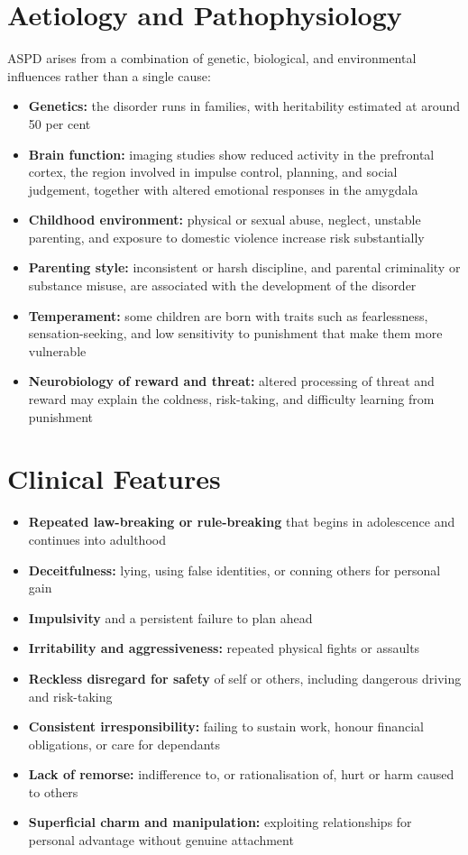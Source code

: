\section*{Aetiology and Pathophysiology}
ASPD arises from a combination of genetic, biological, and environmental influences rather than a single cause:

\begin{itemize}
    \item \textbf{Genetics:} the disorder runs in families, with heritability estimated at around 50 per cent
    \item \textbf{Brain function:} imaging studies show reduced activity in the prefrontal cortex, the region involved in impulse control, planning, and social judgement, together with altered emotional responses in the amygdala
    \item \textbf{Childhood environment:} physical or sexual abuse, neglect, unstable parenting, and exposure to domestic violence increase risk substantially
    \item \textbf{Parenting style:} inconsistent or harsh discipline, and parental criminality or substance misuse, are associated with the development of the disorder
    \item \textbf{Temperament:} some children are born with traits such as fearlessness, sensation-seeking, and low sensitivity to punishment that make them more vulnerable
    \item \textbf{Neurobiology of reward and threat:} altered processing of threat and reward may explain the coldness, risk-taking, and difficulty learning from punishment
\end{itemize}

\section*{Clinical Features}
\begin{itemize}
    \item \textbf{Repeated law-breaking or rule-breaking} that begins in adolescence and continues into adulthood
    \item \textbf{Deceitfulness:} lying, using false identities, or conning others for personal gain
    \item \textbf{Impulsivity} and a persistent failure to plan ahead
    \item \textbf{Irritability and aggressiveness:} repeated physical fights or assaults
    \item \textbf{Reckless disregard for safety} of self or others, including dangerous driving and risk-taking
    \item \textbf{Consistent irresponsibility:} failing to sustain work, honour financial obligations, or care for dependants
    \item \textbf{Lack of remorse:} indifference to, or rationalisation of, hurt or harm caused to others
    \item \textbf{Superficial charm and manipulation:} exploiting relationships for personal advantage without genuine attachment
\end{itemize}

